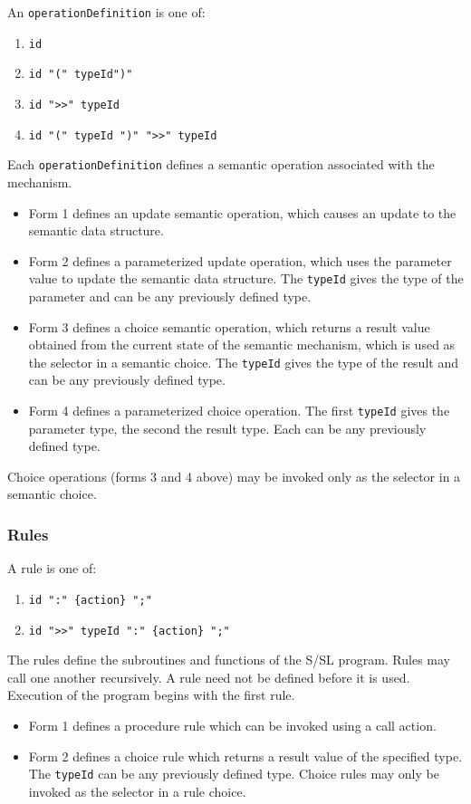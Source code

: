 An {\tt operationDefinition} is one of:
\begin{enumerate}
\item {\tt id}
\item {\tt id "(" typeId")"}
\item {\tt id ">>" typeId}
\item {\tt id "(" typeId ")" ">>" typeId}
\end{enumerate}


Each {\tt operationDefinition} defines  a  semantic operation
associated with the mechanism.
\begin{itemize}
\item Form 1 defines  an         update  semantic  operation,  which
causes an update to the semantic data structure.
\item Form 2 defines a parameterized update operation, which
uses the parameter value to update the semantic data  
structure.  The {\tt typeId} gives the type of the parameter and can be
any previously defined type.
\item Form 3  defines  a         choice  semantic  operation,  which
returns  a  result  value obtained from the current state of
the semantic mechanism, which is used as the selector  in  a
semantic  choice.   The  {\tt typeId} gives the type of the result
and can be any previously defined type.
\item Form 4 defines a parameterized choice  operation. The
first {\tt typeId} gives the parameter type, the second the result
type.  Each can be any previously defined type.
\end{itemize}

Choice operations  (forms 3 and 4 above)  may  be
invoked only as the selector in a semantic choice.




\subsubsection{Rules}

A rule is one of:
\begin{enumerate}
\item {\tt id     ":"           \{action\} ";"}
\item {\tt id ">>"  typeId  ":" \{action\} ";"}
\end{enumerate}


The     rules  define  the  subroutines and functions of the
S/SL program.  Rules may call one  another  recursively.   A
rule  need  not  be defined before it is used.  Execution of
the program begins with the first rule.
\begin{itemize}
\item Form 1 defines a procedure rule which  can         be  invoked
using a call action.
\item Form 2 defines  a  choice rule which returns a result
value  of  the  specified  type.   The  {\tt typeId}    can  be  any
previously  defined  type.  Choice rules may only be invoked
as the selector in a rule choice.
\end{itemize}



